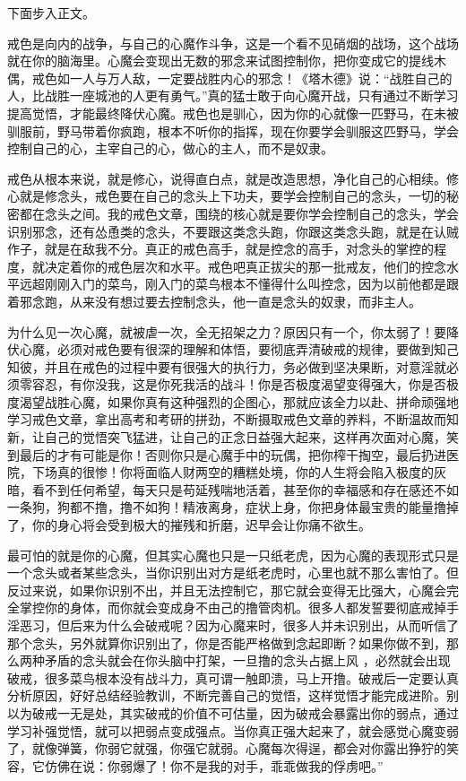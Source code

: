 下面步入正文。

戒色是向内的战争，与自己的心魔作斗争，这是一个看不见硝烟的战场，这个战场就在你的脑海里。心魔会变现出无数的邪念来试图控制你，把你变成它的提线木偶，戒色如一人与万人敌，一定要战胜内心的邪念！《塔木德》说：“战胜自己的人，比战胜一座城池的人更有勇气。”真的猛士敢于向心魔开战，只有通过不断学习提高觉悟，才能最终降伏心魔。戒色也是驯心，因为你的心就像一匹野马，在未被驯服前，野马带着你疯跑，根本不听你的指挥，现在你要学会驯服这匹野马，学会控制自己的心，主宰自己的心，做心的主人，而不是奴隶。

戒色从根本来说，就是修心，说得直白点，就是改造思想，净化自己的心相续。修心就是修念头，戒色要在自己的念头上下功夫，要学会控制自己的念头，一切的秘密都在念头之间。我的戒色文章，围绕的核心就是要你学会控制自己的念头，学会识别邪念，还有怂恿类的念头，不要跟这类念头跑，你跟这类念头跑，就是在认贼作子，就是在敌我不分。真正的戒色高手，就是控念的高手，对念头的掌控的程度，就决定着你的戒色层次和水平。戒色吧真正拔尖的那一批戒友，他们的控念水平远超刚刚入门的菜鸟，刚入门的菜鸟根本不懂得什么叫控念，因为以前他都是跟着邪念跑，从来没有想过要去控制念头，他一直是念头的奴隶，而非主人。

为什么见一次心魔，就被虐一次，全无招架之力？原因只有一个，你太弱了！要降伏心魔，必须对戒色要有很深的理解和体悟，要彻底弄清破戒的规律，要做到知己知彼，并且在戒色的过程中要有很强大的执行力，务必做到坚决果断，对意淫就必须零容忍，有你没我，这是你死我活的战斗！你是否极度渴望变得强大，你是否极度渴望战胜心魔，如果你真有这种强烈的企图心，那就应该全力以赴、拼命顽强地学习戒色文章，拿出高考和考研的拼劲，不断摄取戒色文章的养料，不断温故而知新，让自己的觉悟突飞猛进，让自己的正念日益强大起来，这样再次面对心魔，笑到最后的才有可能是你！否则你只是心魔手中的玩偶，把你榨干掏空，最后扔进医院，下场真的很惨！你将面临人财两空的糟糕处境，你的人生将会陷入极度的灰暗，看不到任何希望，每天只是苟延残喘地活着，甚至你的幸福感和存在感还不如一条狗，狗都不撸，撸不如狗！精液离身，症状上身，你把身体最宝贵的能量撸掉了，你的身心将会受到极大的摧残和折磨，迟早会让你痛不欲生。

最可怕的就是你的心魔，但其实心魔也只是一只纸老虎，因为心魔的表现形式只是一个念头或者某些念头，当你识别出对方是纸老虎时，心里也就不那么害怕了。但反过来说，如果你识别不出，并且无法控制它，那它就会变得无比强大，心魔会完全掌控你的身体，而你就会变成身不由己的撸管肉机。很多人都发誓要彻底戒掉手淫恶习，但后来为什么会破戒呢？因为心魔来时，很多人并未识别出，从而听信了那个念头，另外就算你识别出了，你是否能严格做到念起即断？如果你做不到，那么两种矛盾的念头就会在你头脑中打架，一旦撸的念头占据上风 ，必然就会出现破戒，很多菜鸟根本没有战斗力，真可谓一触即溃，马上开撸。破戒后一定要认真分析原因，好好总结经验教训，不断完善自己的觉悟，这样觉悟才能完成进阶。别以为破戒一无是处，其实破戒的价值不可估量，因为破戒会暴露出你的弱点，通过学习补强觉悟，就可以把弱点变成强点。当你真正强大起来了，就会感觉心魔变弱了，就像弹簧，你弱它就强，你强它就弱。心魔每次得逞，都会对你露出狰狞的笑容，它仿佛在说：你弱爆了！你不是我的对手，乖乖做我的俘虏吧。”

